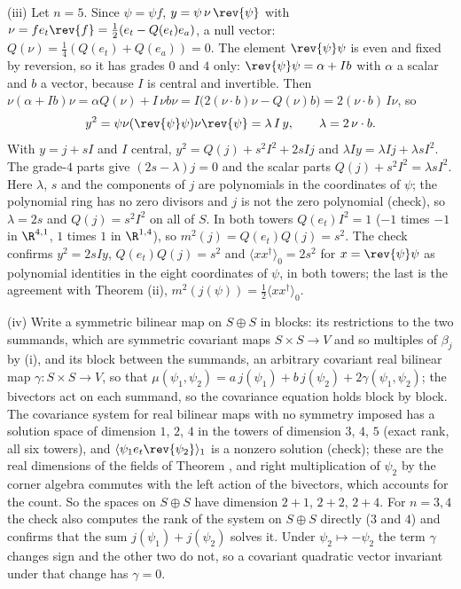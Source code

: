 (iii) Let $n = 5$. Since $\psi = \psi f$, $y = \psi\,\nu\,\rev{\psi}$ with $\nu = f e_{t}\rev{f} = \tfrac12(e_{t} - Q(e_{t})e_{a})$, a null vector: $Q(\nu) = \tfrac14(Q(e_{t}) + Q(e_{a})) = 0$. The element $\rev{\psi}\psi$ is even and fixed by reversion, so it has grades $0$ and $4$ only: $\rev{\psi}\psi = \alpha + Ib$ with $\alpha$ a scalar and $b$ a vector, because $I$ is central and invertible. Then $\nu(\alpha + Ib)\nu = \alpha Q(\nu) + I\,\nu b\nu = I\bigl(2(\nu\cdot b)\nu - Q(\nu)b\bigr) = 2(\nu\cdot b)\,I\nu$, so
\[
y^{2} = \psi\nu(\rev{\psi}\psi)\nu\rev{\psi} = \lambda\,I\,y, \qquad \lambda = 2\,\nu\cdot b .
\]
With $y = j + sI$ and $I$ central, $y^{2} = Q(j) + s^{2}I^{2} + 2sIj$ and $\lambda Iy = \lambda Ij + \lambda sI^{2}$. The grade-$4$ parts give $(2s - \lambda)j = 0$ and the scalar parts $Q(j) + s^{2}I^{2} = \lambda sI^{2}$. Here $\lambda$, $s$ and the components of $j$ are polynomials in the coordinates of $\psi$; the polynomial ring has no zero divisors and $j$ is not the zero polynomial (check), so $\lambda = 2s$ and $Q(j) = s^{2}I^{2}$ on all of $S$. In both towers $Q(e_{t})I^{2} = 1$ ($-1$ times $-1$ in $\R^{4,1}$, $1$ times $1$ in $\R^{1,4}$), so $m^{2}(j) = Q(e_{t})Q(j) = s^{2}$. The check confirms $y^{2} = 2sIy$, $Q(e_{t})Q(j) = s^{2}$ and $\langle xx^{\dagger}\rangle_{0} = 2s^{2}$ for $x = \rev{\psi}\psi$ as polynomial identities in the eight coordinates of $\psi$, in both towers; the last is the agreement with Theorem (ii), $m^{2}(j(\psi)) = \tfrac12\langle xx^{\dagger}\rangle_{0}$.

(iv) Write a symmetric bilinear map on $S \oplus S$ in blocks: its restrictions to the two summands, which are symmetric covariant maps $S \times S \to V$ and so multiples of $\beta_{j}$ by (i), and its block between the summands, an arbitrary covariant real bilinear map $\gamma : S \times S \to V$, so that $\mu(\psi_{1}, \psi_{2}) = a\,j(\psi_{1}) + b\,j(\psi_{2}) + 2\gamma(\psi_{1}, \psi_{2})$; the bivectors act on each summand, so the covariance equation holds block by block. The covariance system for real bilinear maps with no symmetry imposed has a solution space of dimension $1$, $2$, $4$ in the towers of dimension $3$, $4$, $5$ (exact rank, all six towers), and $\langle \psi_{1}e_{t}\rev{\psi_{2}}\rangle_{1}$ is a nonzero solution (check); these are the real dimensions of the fields of Theorem , and right multiplication of $\psi_{2}$ by the corner algebra commutes with the left action of the bivectors, which accounts for the count. So the spaces on $S \oplus S$ have dimension $2 + 1$, $2 + 2$, $2 + 4$. For $n = 3, 4$ the check also computes the rank of the system on $S \oplus S$ directly ($3$ and $4$) and confirms that the sum $j(\psi_{1}) + j(\psi_{2})$ solves it. Under $\psi_{2} \mapsto -\psi_{2}$ the term $\gamma$ changes sign and the other two do not, so a covariant quadratic vector invariant under that change has $\gamma = 0$.

